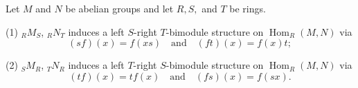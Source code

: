 Let $M$ and $N$ be abelian groups and let $R, S,$ and $T$ be rings.

(1) $_R M_S$, $_R N_T$ induces a left $S$-right $T$-bimodule structure on $\operatorname{Hom}_R(M, N)$ via
$$(sf)(x) = f(xs) \quad \text{and} \quad (ft)(x) = f(x)t;$$

(2) $_S M_R$, $_T N_R$ induces a left $T$-right $S$-bimodule structure on $\operatorname{Hom}_R(M, N)$ via
$$(tf)(x) = tf(x) \quad \text{and} \quad (fs)(x) = f(sx).$$
